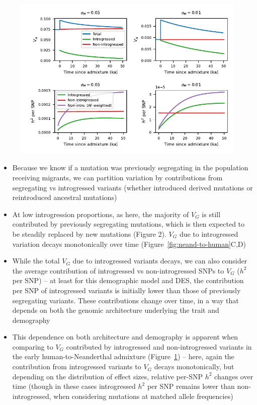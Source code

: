 \documentclass{article}
\begin{document}
\begin{figure}[t!]
    \centering
    \includegraphics{../figures/human_admixture.pdf}
    \caption{
        \textbf{}
    }
    \label{fig:human-to-neand}
\end{figure}

\begin{itemize}
    \item Because we know if a mutation was previously segregating in the population
        receiving migrants, we can partition variation by contributions from
        segregating vs introgressed variants (whether introduced derived mutations
        or reintroduced ancestral mutations)
    \item At low introgression proportions, as here, the majority of $V_G$ is still
        contributed by previously segregating mutations, which is then expected to
        be steadily replaced by new mutations (Figure 2). $V_G$ due to introgressed
        variation decays monotonically over time (Figure~\ref{fig:neand-to-human}C,D)
    \item While the total $V_G$ due to introgressed variants decays, we can also
        consider the average contribution of introgressed vs non-introgressed SNPs
        to $V_G$ ($h^2$ per SNP) -- at least for this demographic model and
        DES, the contribution per SNP of introgressed variants is initially lower
        than those of previously segregating variants. These contributions change
        over time, in a way that depends on both the genomic architecture underlying
        the trait and demography
    \item This dependence on both architecture and demography is apparent when
        comparing to $V_G$ contributed by introgressed and non-introgressed variants
        in the early human-to-Neanderthal admixture (Figure~\ref{fig:human-to-neand})
        -- here, again the contribution
        from introgressed variants to $V_G$ decays monotonically, but depending on
        the distribution of effect sizes, relative per-SNP $h^2$ changes over time
        (though in these cases introgressed $h^2$ per SNP remains lower than
        non-introgressed, when considering mutations at matched allele frequencies)
\end{itemize}
\end{document}
